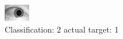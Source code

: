 \begin{figure}[h!]
\begin{center}
\includegraphics[width=0.60\columnwidth]{figures/ID1595_class_2_target_1.png}
\end{center}
\caption{ Classification: 2 actual target: 1}
\label{fig:ID1595_class_2_target_1}
\end{figure}
